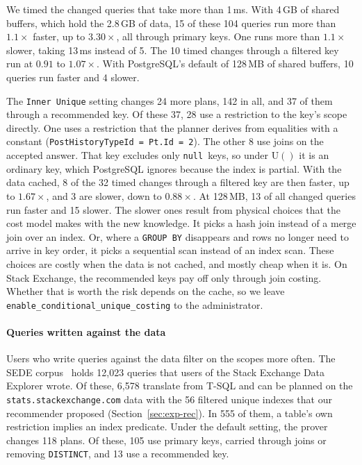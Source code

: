 \documentclass[conference]{IEEEtran}
\theoremstyle{definition}
\newcommand{\sql}[1]{\texttt{#1}}
\newcommand{\nul}{\texttt{null}}
\newcommand{\U}[1]{\mathrm{U}(#1)}
\begin{document}
We timed the changed queries that take more than 1\,ms. With 4\,GB of shared buffers, which hold the 2.8\,GB of data,
15 of these 104 queries run more than $1.1\times$ faster, up to $3.30\times$, all through primary keys. One runs more
than $1.1\times$ slower, taking 13\,ms instead of 5. The 10 timed changes through a filtered key run at $0.91$ to
$1.07\times$. With PostgreSQL's default of 128\,MB of shared buffers, 10 queries run faster and 4 slower.

The \sql{Inner Unique} setting changes 24 more plans, 142 in all, and 37 of them through a recommended key. Of these
37, 28 use a restriction to the key's scope directly. One uses a restriction that the planner derives from equalities with a constant
(\sql{PostHistoryTypeId = Pt.Id = 2}). The other 8 use joins on the accepted answer. That key excludes only \nul\ keys, so
under $\U{}$ it is an ordinary key, which PostgreSQL ignores because the index is partial. With the data cached, 8 of the
32 timed changes through a filtered key are then faster, up to $1.67\times$, and 3 are slower, down to $0.88\times$. At
128\,MB, 13 of all changed queries run faster and 15 slower. The slower ones result from physical choices that the cost
model makes with the new knowledge. It picks a hash join instead of a merge join over an index. Or, where a \sql{GROUP BY}
disappears and rows no longer need to arrive in key order, it picks a sequential scan instead of an index scan. These
choices are costly when the data is not cached, and mostly cheap when it is. On Stack Exchange, the recommended keys pay
off only through join costing. Whether that is worth the risk depends on the cache, so we leave
\sql{enable\_conditional\_unique\_costing} to the administrator.

\else
\paragraph*{Queries written against the data} Users who write queries against the data filter on the scopes more
often. The SEDE corpus~\cite{SEDE} holds 12{,}023 queries that users of the Stack Exchange Data Explorer wrote. Of these,
6{,}578 translate from T-SQL and can be planned on the \sql{stats.stackexchange.com} data with the 56 filtered unique
indexes that our recommender proposed (Section~\ref{sec:exp-rec}). In 555 of them, a table's own restriction implies an
index predicate. Under the default setting, the prover changes 118 plans. Of these, 105 use primary keys, carried through
joins or removing \sql{DISTINCT}, and 13 use a recommended key.
\end{document}

